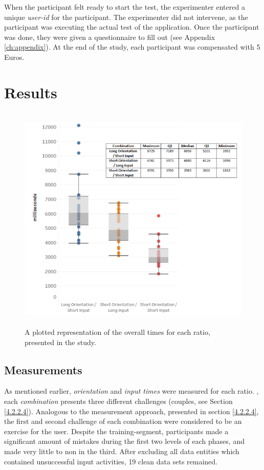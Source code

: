 When the participant felt ready to start the test, the experimenter entered a unique \textit{user-id} for the participant. The experimenter did not intervene, as the participant was executing the actual test of the application. Once the participant was done, they were given a questionnaire to fill out (see Appendix \ref{ch:appendix}). At the end of the study, each participant was compensated with 5 Euros.

\section{Results} \label{5.4}

\begin{figure}[t!]
\centering
\includegraphics[width=13cm, height=11cm]{Chapters/graphics/Combinations.png}
\caption{A plotted representation of the overall times for each ratio, presented in the study.}
\label{fig:combination}
\end{figure}

\subsection{Measurements}

 As mentioned earlier, \textit{orientation} and \textit{input times} were measured for each ratio. , each \textit{combination} presents three different challenges (couples, see Section \ref{4.2.2.4}). Analogous to the measurement approach, presented in section \ref{4.2.2.4}, the first and second challenge of each combination were considered to be an exercise for the user. Despite the training-segment, participants made a significant amount of mistakes during the first two levels of each phases, and made very little to non in the third. After excluding all data entities which contained unsuccessful input activities, 19 clean data sets remained. \\

